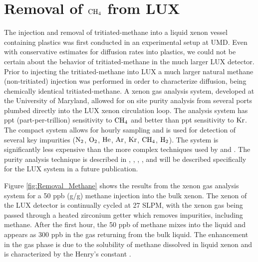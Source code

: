 \section{Removal of $\rm CH_4$ from LUX}

The injection and removal of tritiated-methane into a liquid xenon vessel containing plastics was first conducted in an experimental setup at UMD. Even with conservative estimates for diffusion rates into plastics, we could not be certain about the behavior of tritiated-methane in the much larger LUX detector. Prior to injecting the tritiated-methane into LUX a much larger natural methane (non-tritiated) injection was performed in order to characterize diffusion, being chemically identical tritiated-methane. A xenon gas analysis system, developed at the University of Maryland, allowed for on site purity analysis from several ports plumbed directly into the LUX xenon circulation loop. The analysis system has ppt (part-per-trillion) sensitivity to $\rm CH_4$ and better than ppt sensitivity to $\rm Kr$. The compact system allows for hourly sampling and is used for detection of several key impurities ($\rm N_2$, $\rm O_2$, $\rm He$, $\rm Ar$, $\rm Kr$, $\rm CH_4$, $\rm H_2$). The system is  significantly less expensive than the more complex techniques used by \cite{ATTA} and \cite{Kr_ppq}. The purity analysis technique is described in \cite{coldtrap}, \cite{Dobi_CH4}, \cite{EXO_SAM}, \cite{Kr_ppt_Dobi},  and will be described specifically for the LUX system in a future publication. %

Figure \ref{fig:Removal_Methane} shows the results from the xenon gas analysis system for a 50 ppb (g/g) methane injection into the bulk xenon. The xenon of the LUX detector is continually cycled at 27 SLPM, with the xenon gas being passed through a heated zirconium getter which removes impurities, including methane. After the first hour, the 50 ppb of methane mixes into the liquid and appears as 300 ppb in the gas returning from the bulk liquid. The enhancement in the gas phase is due to the solubility of methane dissolved in liquid xenon and is characterized by the Henry's constant .

